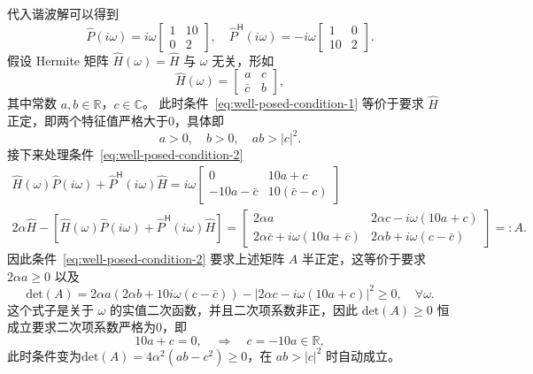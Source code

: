 \begin{solution*}
    代入谐波解可以得到
    \[
        \widehat{P}(i\omega)=i\omega \begin{bmatrix}
            1 & 10 \\
            0 & 2
        \end{bmatrix},\quad
        \widehat{P}^\mathsf{H}(i\omega)=-i\omega \begin{bmatrix}
            1  & 0 \\
            10 & 2
        \end{bmatrix}.
    \]
    假设 Hermite 矩阵 $\widehat{H}(\omega) = \widehat{H}$ 与 $\omega$ 无关，形如
    \[
        \widehat{H}(\omega)=\begin{bmatrix}
            a       & c \\
            \bar{c} & b
        \end{bmatrix},
    \]
    其中常数 $a,b \in \mathbb{R}$，$c \in \mathbb{C}$。
    此时条件~\eqref{eq:well-posed-condition-1} 等价于要求 $\widehat{H}$ 正定，即两个特征值严格大于0，具体即
    \[
        a > 0,\quad b > 0,\quad a b > |c|^2.
    \]
    接下来处理条件~\eqref{eq:well-posed-condition-2}
    \begin{gather*}
        \widehat{H}(\omega)\widehat{P}(i\omega)+\widehat{P}^\mathsf{H}(i\omega)\widehat{H}=
        i\omega \begin{bmatrix}
            0            & 10a+c         \\
            -10a-\bar{c} & 10(\bar{c}-c)
        \end{bmatrix} \\
        2 \alpha \widehat{H} - \left[\widehat{H}(\omega)\widehat{P}(i\omega)+\widehat{P}^\mathsf{H}(i\omega)\widehat{H}\right]
        = \begin{bmatrix}
            2 \alpha a                                   & 2 \alpha c - i \omega(10 a + c)     \\
            2 \alpha \bar{c} + i \omega (10 a + \bar{c}) & 2 \alpha b + i \omega (c - \bar{c})
        \end{bmatrix} =: A.
    \end{gather*}
    因此条件~\eqref{eq:well-posed-condition-2} 要求上述矩阵 $A$ 半正定，这等价于要求 $2 \alpha a \ge 0$ 以及
    \[
        \text{det}(A) = 2 \alpha a(2 \alpha b + 10 i \omega(c - \bar{c}))
        - |2\alpha c - i \omega(10a + c)|^2 \ge 0,\quad \forall \omega.
    \]
    这个式子是关于 $\omega$ 的实值二次函数，并且二次项系数非正，因此 $\text{det}(A) \ge 0$ 恒成立要求二次项系数严格为0，即
    \[
        10 a + c = 0, \quad \Rightarrow \quad c = -10 a \in \mathbb{R},
    \]
    此时条件变为$\text{det}(A) = 4 \alpha^2 (a b - c^2) \ge 0$，在 $ab > |c|^2$ 时自动成立。



\end{solution*}
